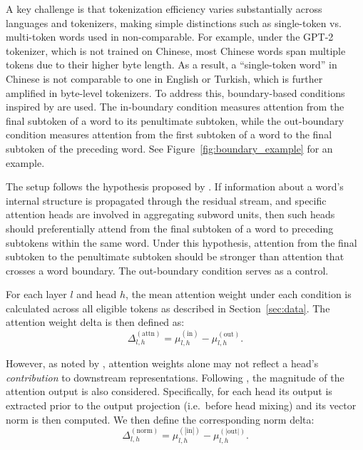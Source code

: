 A key challenge is that tokenization efficiency varies substantially across languages and tokenizers, making simple distinctions such as single-token vs. multi-token words used in \citet{kaplan2025} non-comparable. For example, under the GPT-2 tokenizer, which is not trained on Chinese, most Chinese words span multiple tokens due to their higher byte length. As a result, a ``single-token word'' in Chinese is not comparable to one in English or Turkish, which is further amplified in byte-level tokenizers. To address this, boundary-based conditions inspired by \citet{kaplan2025, ferrando2024informationflow} are used. The in-boundary condition measures attention from the final subtoken of a word to its penultimate subtoken, while the out-boundary condition measures attention from the first subtoken of a word to the final subtoken of the preceding word. See Figure~\ref{fig:boundary_example} for an example.



The setup follows the hypothesis proposed by \citet{kaplan2025, ferrando2024informationflow}. If information about a word's internal structure is propagated through the residual stream, and specific attention heads are involved in aggregating subword units, then such heads should preferentially attend from the final subtoken of a word to preceding subtokens within the same word. Under this hypothesis, attention from the final subtoken to the penultimate subtoken should be stronger than attention that crosses a word boundary. The out-boundary condition serves as a control.

For each layer $l$ and head $h$, the mean attention weight under each condition is calculated across all eligible tokens as described in Section~\ref{sec:data}. The attention weight delta is then defined as:
\begin{equation}\label{eq:delta_attn}
\Delta^{(\text{attn})}_{l,h} = \mu_{l,h}^{(\text{in})} - \mu_{l,h}^{(\text{out})}.
\end{equation}

However, as noted by \citet{jain2019, serrano2019}, attention weights alone may not reflect a head's \textit{contribution} to downstream representations. Following \citet{kobayashi2020}, the magnitude of the attention output is also considered. Specifically, for each head its output is extracted prior to the output projection (i.e.\ before head mixing) and its vector norm is then computed. We then define the corresponding norm delta:
\begin{equation}\label{eq:delta_norm}
\Delta^{(\text{norm})}_{l,h} = \mu_{l,h}^{(|\text{in}|)} - \mu_{l,h}^{(|\text{out}|)}.
\end{equation}

